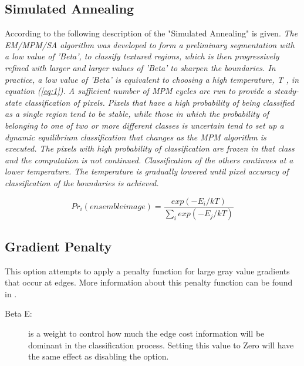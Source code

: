 \documentclass[12pt,oneside]{book}
\begin{document}
\subsection{Simulated Annealing}
According to \cite{2} the following description of the "Simulated Annealing" is given. {\em The EM/MPM/SA algorithm was developed to form a preliminary segmentation with a low value of 'Beta', to classify textured regions, which is then progressively refined with larger and larger values of 'Beta' to sharpen the boundaries. In practice, a low value of 'Beta' is equivalent to choosing a high temperature, T , in equation  (\ref{eq:1}). A sufficient number of MPM cycles are run to provide a steady-state classification of pixels. Pixels that have a high probability of being classified as a single region tend to be stable, while those in which the probability of belonging to one of two or more different classes is uncertain tend to set up a dynamic equilibrium classification that changes as the MPM algorithm is executed. The pixels with high probability of classification are frozen in that class and the computation is not continued. Classification of the others continues at a lower temperature. The temperature is gradually lowered until pixel accuracy of classification of the boundaries is achieved.}

\begin{equation}
\label{eq:1}
Pr_i (ensemble image) = \frac{exp(-E_i/kT)}{\sum_{i}exp(-E_j/kT)}
\end{equation}

\subsection{Gradient Penalty}
This option attempts to apply a penalty function for large gray value gradients that occur at edges. More information about this penalty function can be found in \cite{4}.
\begin{description}
\item[Beta E:]  is a weight to control how much the edge cost information will be dominant in the classification process. Setting this value to Zero will have the same effect as disabling the option.
\end{description}
\end{document}
